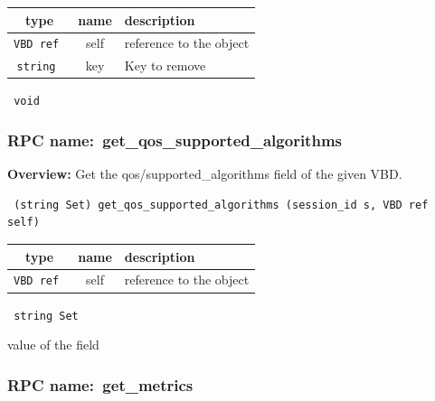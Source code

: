  
\vspace{0.3cm}
\begin{tabular}{|c|c|p{7cm}|}
 \hline
{\bf type} & {\bf name} & {\bf description} \\ \hline
{\tt VBD ref } & self & reference to the object \\ \hline 

{\tt string } & key & Key to remove \\ \hline 

\end{tabular}

\vspace{0.3cm}

{\tt 
void
}



\vspace{0.3cm}
\vspace{0.3cm}
\vspace{0.3cm}
\subsubsection{RPC name:~get\_qos\_supported\_algorithms}

{\bf Overview:} 
Get the qos/supported\_algorithms field of the given VBD.

\begin{verbatim} (string Set) get_qos_supported_algorithms (session_id s, VBD ref self)\end{verbatim}



 
\vspace{0.3cm}
\begin{tabular}{|c|c|p{7cm}|}
 \hline
{\bf type} & {\bf name} & {\bf description} \\ \hline
{\tt VBD ref } & self & reference to the object \\ \hline 

\end{tabular}

\vspace{0.3cm}

{\tt 
string Set
}


value of the field
\vspace{0.3cm}
\vspace{0.3cm}
\vspace{0.3cm}
\subsubsection{RPC name:~get\_metrics}

